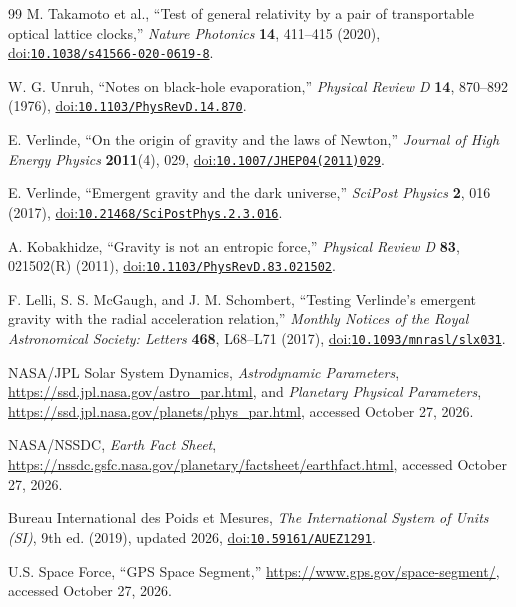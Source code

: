 \documentclass[12pt]{article}
\begin{document}
\begin{thebibliography}{99}
M. Takamoto et al.,
``Test of general relativity by a pair of transportable optical lattice clocks,''
\emph{Nature Photonics} \textbf{14}, 411--415 (2020),
\href{https://doi.org/10.1038/s41566-020-0619-8}{doi:\nolinkurl{10.1038/s41566-020-0619-8}}.

W. G. Unruh,
``Notes on black-hole evaporation,''
\emph{Physical Review D} \textbf{14}, 870--892 (1976),
\href{https://doi.org/10.1103/PhysRevD.14.870}{doi:\nolinkurl{10.1103/PhysRevD.14.870}}.

E. Verlinde,
``On the origin of gravity and the laws of Newton,''
\emph{Journal of High Energy Physics} \textbf{2011}(4), 029,
\href{https://doi.org/10.1007/JHEP04(2011)029}{doi:\nolinkurl{10.1007/JHEP04(2011)029}}.

E. Verlinde,
``Emergent gravity and the dark universe,''
\emph{SciPost Physics} \textbf{2}, 016 (2017),
\href{https://doi.org/10.21468/SciPostPhys.2.3.016}{doi:\nolinkurl{10.21468/SciPostPhys.2.3.016}}.

A. Kobakhidze,
``Gravity is not an entropic force,''
\emph{Physical Review D} \textbf{83}, 021502(R) (2011),
\href{https://doi.org/10.1103/PhysRevD.83.021502}{doi:\nolinkurl{10.1103/PhysRevD.83.021502}}.

F. Lelli, S. S. McGaugh, and J. M. Schombert,
``Testing Verlinde's emergent gravity with the radial acceleration relation,''
\emph{Monthly Notices of the Royal Astronomical Society: Letters} \textbf{468}, L68--L71 (2017),
\href{https://doi.org/10.1093/mnrasl/slx031}{doi:\nolinkurl{10.1093/mnrasl/slx031}}.

NASA/JPL Solar System Dynamics,
\emph{Astrodynamic Parameters},
\url{https://ssd.jpl.nasa.gov/astro_par.html}, and
\emph{Planetary Physical Parameters},
\url{https://ssd.jpl.nasa.gov/planets/phys_par.html},
accessed October 27, 2026.

NASA/NSSDC,
\emph{Earth Fact Sheet},
\url{https://nssdc.gsfc.nasa.gov/planetary/factsheet/earthfact.html},
accessed October 27, 2026.

Bureau International des Poids et Mesures,
\emph{The International System of Units (SI)}, 9th ed. (2019), updated 2026,
\href{https://doi.org/10.59161/AUEZ1291}{doi:\nolinkurl{10.59161/AUEZ1291}}.

U.S. Space Force,
``GPS Space Segment,''
\url{https://www.gps.gov/space-segment/},
accessed October 27, 2026.

\end{thebibliography}
\end{document}
